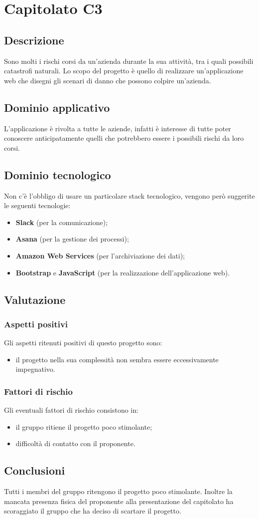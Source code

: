\section {Capitolato C3}
	\subsection {Descrizione}
		Sono molti i rischi corsi da un'azienda durante la sua attività, tra i quali possibili catastrofi naturali. Lo scopo del progetto è quello di realizzare un'applicazione web che disegni gli scenari di
		danno che possono colpire un'azienda.
	\subsection {Dominio applicativo}
		L'applicazione è rivolta a tutte le aziende, infatti è interesse di tutte poter conoscere anticipatamente quelli che potrebbero essere i possibili rischi da loro corsi.
	\subsection {Dominio tecnologico}
		Non c'è l'obbligo di usare un particolare stack tecnologico, vengono però suggerite le seguenti tecnologie:
		\begin{itemize}
			\item \textbf{Slack} (per la comunicazione);
			\item \textbf{Asana} (per la gestione dei processi);
			\item \textbf{Amazon Web Services} (per l'archiviazione dei dati);
			\item \textbf{Bootstrap} e \textbf{JavaScript} (per la realizzazione dell'applicazione web).
		\end{itemize}
	\subsection {Valutazione}
		\subsubsection {Aspetti positivi}
		Gli aspetti ritenuti positivi di questo progetto sono:
			\begin{itemize}
				\item il progetto nella sua complessità non sembra essere eccessivamente impegnativo.
			\end{itemize}
		\subsubsection {Fattori di rischio}
		Gli eventuali fattori di rischio consistono in:
			\begin{itemize}
				\item il gruppo ritiene il progetto poco stimolante;
				\item difficoltà di contatto con il proponente.
			\end{itemize}
	\subsection {Conclusioni}
		Tutti i membri del gruppo ritengono il progetto poco stimolante. Inoltre la mancata presenza fisica del proponente alla presentazione del capitolato ha scoraggiato il gruppo che ha deciso di scartare il progetto.
